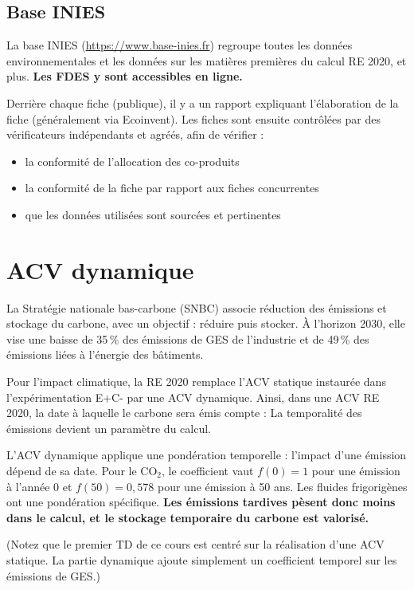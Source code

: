 \subsection*{Base INIES}

La base INIES (\url{https://www.base-inies.fr}) regroupe toutes les données environnementales et les données sur les matières premières du calcul RE 2020, et plus. \textbf{Les FDES y sont accessibles en ligne.}

Derrière chaque fiche (publique), il y a un rapport expliquant l'élaboration de la fiche (généralement via Ecoinvent). Les fiches sont ensuite contrôlées par des vérificateurs indépendants et agréés, afin de vérifier :
\begin{itemize}
  \item la conformité de l'allocation des co-produits
  \item la conformité de la fiche par rapport aux fiches concurrentes
  \item que les données utilisées sont sourcées et pertinentes
\end{itemize}

\section{ACV dynamique}
La Stratégie nationale bas-carbone (SNBC) associe réduction des émissions et stockage du carbone, avec un objectif : réduire puis stocker. À l'horizon 2030, elle vise une baisse de 35\,\% des émissions de GES de l'industrie et de 49\,\% des émissions liées à l'énergie des bâtiments.

Pour l'impact climatique, la RE 2020 remplace l'ACV statique instaurée dans l'expérimentation E+C- par une ACV dynamique. Ainsi, dans une ACV RE 2020, la date à laquelle le carbone sera émis compte : La temporalité des émissions devient un paramètre du calcul.

L'ACV dynamique applique une pondération temporelle : l'impact d'une émission dépend de sa date. Pour le CO$_2$, le coefficient vaut $f(0)=1$ pour une émission à l'année 0 et $f(50)=0{,}578$ pour une émission à 50 ans. Les fluides frigorigènes ont une pondération spécifique. \textbf{Les émissions tardives pèsent donc moins dans le calcul, et le stockage temporaire du carbone est valorisé.}

(Notez que le premier TD de ce cours est centré sur la réalisation d'une ACV statique. La partie dynamique ajoute simplement un coefficient temporel sur les émissions de GES.)
